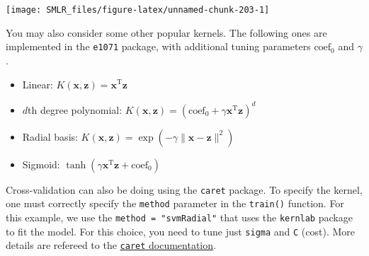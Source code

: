 \documentclass[
]{book}
\providecommand{\tightlist}{%
  \setlength{\itemsep}{0pt}\setlength{\parskip}{0pt}}
\theoremstyle{definition}
\theoremstyle{definition}
\theoremstyle{definition}
\theoremstyle{definition}
\theoremstyle{remark}
\begin{document}
\begin{center}\texttt{[image: SMLR\_files/figure-latex/unnamed-chunk-203-1]} \end{center}

You may also consider some other popular kernels. The following ones are implemented in the \texttt{e1071} package, with additional tuning parameters \(\text{coef}_0\) and \(\gamma\).

\begin{itemize}
\tightlist
\item
  Linear: \(K(\mathbf{x}, \mathbf{z}) = \mathbf{x}^\text{T}\mathbf{z}\)
\item
  \(d\)th degree polynomial: \(K(\mathbf{x}, \mathbf{z}) = (\text{coef}_0 + \gamma \mathbf{x}^\text{T}\mathbf{z})^d\)
\item
  Radial basis: \(K(\mathbf{x}, \mathbf{z}) = \exp(- \gamma \lVert \mathbf{x}- \mathbf{z}\lVert^2)\)
\item
  Sigmoid: \(\tanh(\gamma \mathbf{x}^\text{T}\mathbf{z}+ \text{coef}_0)\)
\end{itemize}

Cross-validation can also be doing using the \texttt{caret} package. To specify the kernel, one must correctly specify the \texttt{method} parameter in the \texttt{train()} function. For this example, we use the \texttt{method\ =\ "svmRadial"} that uses the \texttt{kernlab} package to fit the model. For this choice, you need to tune just \texttt{sigma} and \texttt{C} (cost). More details are refereed to the \href{https://topepo.github.io/caret/train-models-by-tag.html\#support-vector-machines}{\texttt{caret} documentation}.
\end{document}
